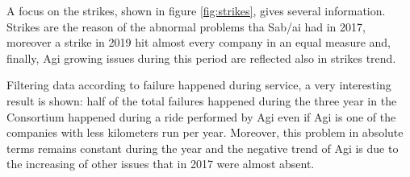 \newpage

\begin{landscape}
\thispagestyle{empty}

\end{landscape}
\newpage

A focus on the strikes, shown in figure \ref{fig:strikes}, gives several information. Strikes are the reason of the abnormal problems tha Sab/ai had in 2017, moreover a strike in 2019 hit almost every company in an equal measure and, finally, Agi growing issues during this period are reflected also in strikes trend. 

Filtering data according to failure happened during service, a very interesting result is shown: half of the total failures happened during the three year in the Consortium happened during a ride performed by Agi even if Agi is one of the companies with less kilometers run per year. Moreover, this problem in absolute terms remains constant during the year and the negative trend of Agi is due to the increasing of other issues that in 2017 were almost absent.

\newpage
\begin{landscape}
\thispagestyle{empty}

\end{landscape}
\newpage
